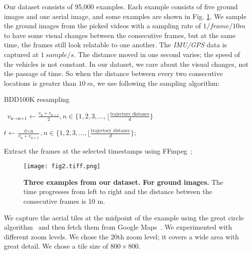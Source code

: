 \documentclass[10pt,letterpaper]{article}
\newif\ifhighlight
\newcommand{\hlb}[1]{\ifhighlight{\hl{#1}}\else{#1}\fi}
\begin{document}
Our dataset consists of 95,000 examples. Each example consists of five ground images and one aerial image, and some examples are shown in \hlb{Fig.} \ref{fig2}. We sample the ground images from the picked videos with a sampling rate of $1 / frame/10 m$ to have some visual changes between the consecutive frames, but at the same time, the frames still look relatable to one another. The \emph{IMU/GPS} data is captured at $1 \ sample/s$. The distance moved in one second varies; the speed of the vehicles is not constant. In our dataset, we care about the visual changes, not the passage of time. So when the distance between every two consecutive locations is greater than $10 \ m$,  we use following the sampling algorithm:

\begin{algorithm}[!h]
\caption{BDD100K resampling}
\
$v_{\text{n} \to \text{n+1}} \gets \frac{v_{\text{n}} + v_{\text{n} + 1}}{2}, n \in \{1, 2, 3, \text{\ldots}, \lfloor\frac{\text{trajectory distance}}{d} \}$ \;

\Comment{To get the timestamp of the nth frame ($t_{\text{n}}$)}

$t \gets \frac{\text{d} \times  \text{n}}{v_{\text{n}} + v_{\text{n} + 1}} , n \in \{1, 2, 3, \text{\ldots}, \lfloor\frac{\text{trajectory distance}}{d} \} $;\

Extract the frames at the selected timestamps using FFmpeg~\cite{bib23};\
\end{algorithm}

\begin{figure}[!ht]
  \caption{{\bf Three examples from our dataset. For ground images.} The time progresses from left to right and the distance between the consecutive frames is 10 m.}
  \texttt{[image: fig2.tiff.png]}
  \label{fig2}
\end{figure}

We capture the aerial tiles at the midpoint of the example using the great circle algorithm~\cite{bib16} and then fetch them from Google Maps~\cite{bib15}. We experimented with different zoom levels. We chose the 20th zoom level; it covers a wide area with great detail. We chose a tile size of  $800 \times 800$.
\end{document}
